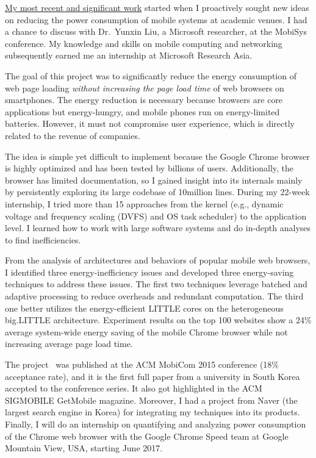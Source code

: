\ul{My most recent and significant work} started when I proactively sought new ideas on reducing the power consumption of mobile systems at academic venues. I had a chance to discuss with Dr.~Yunxin Liu, a Microsoft researcher, at the MobiSys conference.
My knowledge and skills on mobile computing and networking subsequently earned me an internship at Microsoft Research Asia.

The goal of this project was to significantly reduce the energy consumption of web page loading \emph{without increasing the page load time} of web browsers on smartphones.
The energy reduction is necessary because browsers are core applications but energy-hungry, and mobile phones run on energy-limited batteries. However, it must not compromise user experience, which is directly related to the revenue of companies.

The idea is simple yet difficult to implement because the Google Chrome browser is highly optimized and has been tested by billions of users. Additionally, the browser has limited documentation, so I gained insight into its internals mainly by persistently exploring its large codebase of 10\Plus million lines.
During my 22-week internship, I tried more than 15 approaches from the kernel (e.g., dynamic voltage and frequency scaling (DVFS) and OS task scheduler) to the application level.
I learned how to work with large software systems and do in-depth analyses to find inefficiencies.

From the analysis of architectures and behaviors of popular mobile web browsers, I identified three energy-inefficiency issues and developed three energy-saving techniques to address these issues.
The first two techniques leverage batched and adaptive processing to reduce overheads and redundant computation.
The third one better utilizes the energy-efficient LITTLE cores on the heterogeneous big.LITTLE architecture.
Experiment results on the top 100 websites show a 24\% average system-wide energy saving of the mobile Chrome browser while not increasing average page load time.

The project~\cite{ebrowser} was published at the ACM MobiCom 2015 conference (18\% acceptance rate), and it is the first full paper from a university in South Korea accepted to the conference series. It also got highlighted in the ACM SIGMOBILE GetMobile magazine.
Moreover, I had a project from Naver (the largest search engine in Korea) for integrating my techniques into its products.
Finally, I will do an internship on quantifying and analyzing power consumption of the Chrome web browser with the Google Chrome Speed team at Google Mountain View, USA, starting June 2017.

